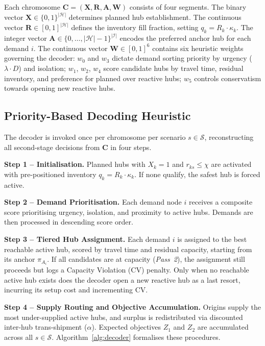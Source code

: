 \documentclass{llncs}
\begin{document}
Each chromosome $\mathbf{C} = (\mathbf{X}, \mathbf{R}, \mathbf{A}, \mathbf{W})$ consists of four segments. The binary vector $\mathbf{X} \in \{0,1\}^{|\mathcal{H}|}$ determines planned hub establishment. The continuous vector $\mathbf{R} \in [0,1]^{|\mathcal{H}|}$ defines the inventory fill fraction, setting $q_k = R_k \cdot \kappa_k$. The integer vector $\mathbf{A} \in \{0,\ldots,|\mathcal{H}|-1\}^{|\mathcal{I}|}$ encodes the preferred anchor hub for each demand $i$. The continuous vector $\mathbf{W} \in [0,1]^6$ contains six heuristic weights governing the decoder: $w_0$ and $w_3$ dictate demand sorting priority by urgency ($\lambda \cdot D$) and isolation; $w_1$, $w_2$, $w_4$ score candidate hubs by travel time, residual inventory, and preference for planned over reactive hubs; $w_5$ controls conservatism towards opening new reactive hubs.

\subsection{Priority-Based Decoding Heuristic}
\label{sec:decoder}

The decoder is invoked once per chromosome per scenario $s \in \mathcal{S}$, reconstructing all second-stage decisions from $\mathbf{C}$ in four steps.

\textbf{Step 1 -- Initialisation.} Planned hubs with $X_k = 1$ and $r_{ks} \le \chi$ are activated with pre-positioned inventory $q_k = R_k \cdot \kappa_k$. If none qualify, the safest hub is forced active.

\textbf{Step 2 -- Demand Prioritisation.} Each demand node $i$ receives a composite score prioritising urgency, isolation, and proximity to active hubs. Demands are then processed in descending score order.

\textbf{Step 3 -- Tiered Hub Assignment.} Each demand $i$ is assigned to the best reachable active hub, scored by travel time and residual capacity, starting from its anchor $\pi_{A_i}$. If all candidates are at capacity (\textit{Pass~2}), the assignment still proceeds but logs a Capacity Violation (CV) penalty. Only when no reachable active hub exists does the decoder open a new reactive hub as a last resort, incurring its setup cost and incrementing CV.

\textbf{Step 4 -- Supply Routing and Objective Accumulation.} Origins supply the most under-supplied active hubs, and surplus is redistributed via discounted inter-hub trans-shipment ($\alpha$). Expected objectives $Z_1$ and $Z_2$ are accumulated across all $s \in \mathcal{S}$. Algorithm~\ref{alg:decoder} formalises these procedures.
\end{document}
